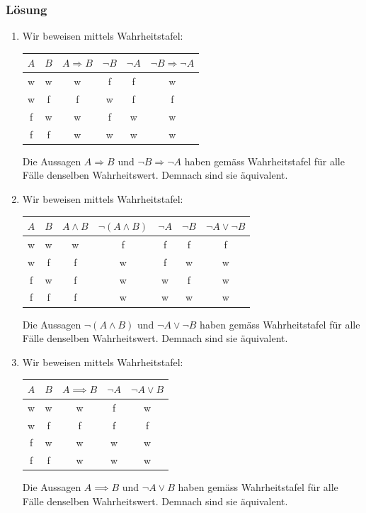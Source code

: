 \documentclass[a4paper,10pt]{article}
\newcommand{\s}[1]{#1}
\begin{document}
\s{\subsubsection*{Lösung}
\begin{enumerate}[label=(\alph*)]
    \item Wir beweisen mittels Wahrheitstafel:
        \begin{center}
            \begin{tabular}{c | c || c | c | c | c}
                $A$ & $B$ & $A \Rightarrow B$ & $\neg B$ & $\neg A$ & $\neg B \Rightarrow \neg A$ \\ \hline
                w & w & w & f & f & w \\
                w & f & f & w & f & f \\
                f & w & w & f & w & w \\
                f & f & w & w & w & w \\
            \end{tabular}
        \end{center}
        Die Aussagen $A \Rightarrow B$ und $\neg B \Rightarrow \neg A$ haben gemäss Wahrheitstafel für alle Fälle denselben Wahrheitswert. Demnach sind sie äquivalent.
    \item Wir beweisen mittels Wahrheitstafel:
        \begin{center}
            \begin{tabular}{c | c || c | c | c | c | c}
                $A$ & $B$ & $A \land B$ & $\neg (A \land B)$ & $\neg A$ & $\neg B$ & $\neg A \lor \neg B$ \\ \hline
                w & w & w & f & f & f & f \\
                w & f & f & w & f & w & w \\
                f & w & f & w & w & f & w \\
                f & f & f & w & w & w & w \\
            \end{tabular}
        \end{center}
        Die Aussagen $\neg (A \land B)$ und $\neg A \lor \neg B$ haben gemäss Wahrheitstafel für alle Fälle denselben Wahrheitswert. Demnach sind sie äquivalent.
        \item Wir beweisen mittels Wahrheitstafel:
        \begin{center}
            \begin{tabular}{c | c || c | c | c }
                $A$ & $B$ & $A \implies B$ & $\neg A$ & $\neg A \lor  B$ \\ \hline
                w & w & w  & f  & w \\
                w & f & f  & f  & f \\
                f & w & w  & w  & w \\
                f & f & w  & w  & w \\
            \end{tabular}
        \end{center}
        Die Aussagen $A\implies B$ und $\neg A\lor B$ haben gemäss Wahrheitstafel für alle Fälle denselben Wahrheitswert. Demnach sind sie äquivalent.
\end{enumerate}
}
\end{document}
